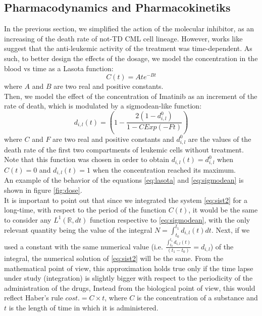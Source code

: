 \documentclass[a4paper,10pt]{article}
\begin{document}
\FloatBarrier
\subsection{Pharmacodynamics and Pharmacokinetiks}
In the previous section, we simplified the action 
of the molecular inhibitor, as an increasing of the death rate of not-TD CML cell lineage.
However, works like \cite{ishida2016pharmacokinetics, yoshitsugu2012markov}
suggest that the anti-leukemic 
activity of the treatment was time-dependent. 
As such, to better design the effects of the dosage, we model the concentration in the blood vs
time as a Lasota
\cite{wazewska1976matematyczne} function:
\begin{equation}
C(t)=A t e^{-Bt}
\label{eq:lasota}
\end{equation}
where $A$ and $B$ are two real and positive constants.\\
Then, we model the effect of the concentration of Imatinib as an increment 
of the rate of death, which is modulated by a sigmodean-like function:
\begin{equation}
d_{i,l}(t)= \left(1-\frac{2(1- d_{i,l}^0)}{1-CExp(-Ft)} \right)
\label{eq:sigmodean}
\end{equation}
where $C$ and $F$ are two real and positive constants
and $d_{i,l}^0$ are the values of the death rate of the first
two compartments of leukemic cells without treatment. Note that this function
was chosen in order to obtain $d_{i,l}(t)=d_{i,l}^0$ when $C(t)=0$ and $d_{i,l}(t)=1$
when the concentration reached its maximum.\\
An example of the behavior of the equations \eqref{eq:lasota} and \eqref{eq:sigmodean} 
is shown in figure \ref{fig:dose}.\\
It is important to point out that
since we integrated the system \ref{eq:sist2} for a long-time, with respect
to the period of the function $C(t)$,
it would be the same to consider any $L^1(\mathbb{R},dt)$ 
function respective to \eqref{eq:sigmodean},
with the only relevant quantity being the value of the integral
$N= \int_{t_0}^{t_1} d_{i,l}(t) dt$.
Next, if we used a constant with the same numerical value 
(i.e. $ \frac{\int_{t_0}^{t_1}d_{i,l}(t)}{(t_1-t_0)}=d_{i,l} $) 
of the integral, 
the numerical solution of \eqref{eq:sist2} will be the same.
From the mathematical point of view,
this approximation holds true only if the time lapse under study (integration) is 
slightly bigger with respect to the periodicity of the 
administration of the drugs,
Instead from the biological point of view, 
this would reflect  Haber's rule \cite{miller2000haber}
$cost.= C\times t$, where $C$ is the concentration of a substance 
and $t$ is the length of time in which it is administered.\\
\end{document}
